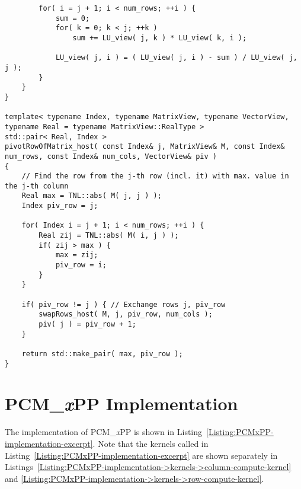 \begin{lstlisting}
		for( i = j + 1; i < num_rows; ++i ) {
			sum = 0;
			for( k = 0; k < j; ++k )
				sum += LU_view( j, k ) * LU_view( k, i );
			
			LU_view( j, i ) = ( LU_view( j, i ) - sum ) / LU_view( j, j );
		}
	}
}

template< typename Index, typename MatrixView, typename VectorView, typename Real = typename MatrixView::RealType >
std::pair< Real, Index >
pivotRowOfMatrix_host( const Index& j, MatrixView& M, const Index& num_rows, const Index& num_cols, VectorView& piv )
{
	// Find the row from the j-th row (incl. it) with max. value in the j-th column
	Real max = TNL::abs( M( j, j ) );
	Index piv_row = j;
	
	for( Index i = j + 1; i < num_rows; ++i ) {
		Real zij = TNL::abs( M( i, j ) );
		if( zij > max ) {
			max = zij;
			piv_row = i;
		}
	}
	
	if( piv_row != j ) { // Exchange rows j, piv_row
		swapRows_host( M, j, piv_row, num_cols );
		piv( j ) = piv_row + 1;
	}
	
	return std::make_pair( max, piv_row );
}
\end{lstlisting}





\chapter{PCM\_\textit{x}PP Implementation}\label{Appendix:PCMxPP-implementation}
The implementation of PCM\_\textit{x}PP is shown in Listing~\ref{Listing:PCMxPP-implementation-excerpt}.
Note that the kernels called in Listing~\ref{Listing:PCMxPP-implementation-excerpt} are shown separately in Listings~\ref{Listing:PCMxPP-implementation->kernels->column-compute-kernel} and \ref{Listing:PCMxPP-implementation->kernels->row-compute-kernel}.

